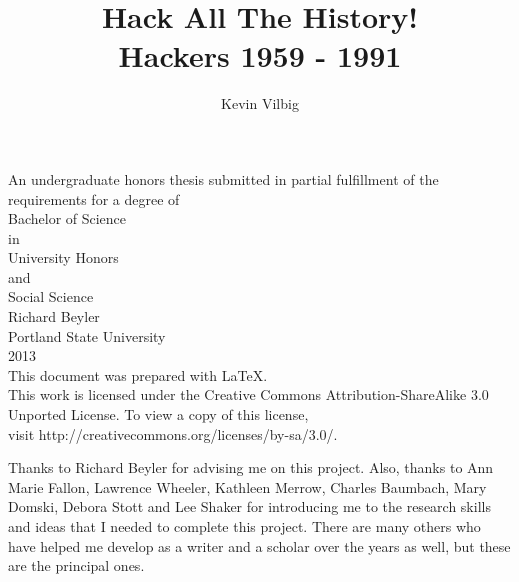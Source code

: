 \documentclass[11pt]{article}
\begin{document}
\title{Hack All The History! \\ Hackers 1959 - 1991}
\author{Kevin Vilbig}
\maketitle
\thispagestyle{empty}
\begin{center}
An undergraduate honors thesis submitted in partial fulfillment of the \\
requirements for a degree of \\
Bachelor of Science\\
in\\
University Honors \\
and \\
Social Science\\
Richard Beyler\\
Portland State University\\
2013 \\
This document was prepared with \LaTeX.\\
This work is licensed under the Creative Commons Attribution-ShareAlike 3.0 Unported License. To view a copy of this license,\\ visit http://creativecommons.org/licenses/by-sa/3.0/.
\end{center}

\newpage
{}
Thanks to Richard Beyler for advising me on this project. Also, thanks to Ann Marie Fallon, Lawrence Wheeler, Kathleen Merrow, Charles Baumbach, Mary Domski, Debora Stott and Lee Shaker for introducing me to the research skills and ideas that I needed to complete this project. There are many others who have helped me develop as a writer and a scholar over the years as well, but these are the principal ones.

\newpage
\end{document}
